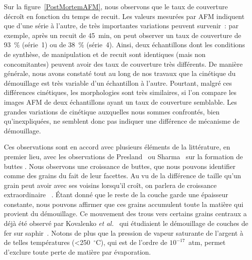 Sur la figure~\ref{PostMortemAFM}, nous observons que le taux de couverture décroît en fonction du temps de recuit. Les valeurs mesurées par AFM indiquent que d'une série à l'autre, de très importantes variations peuvent survenir~: par exemple, après un recuit de 45~min, on peut observer un taux de couverture de 93~\% (série~1) ou de 38~\% (série~4). Ainsi, deux échantillons dont les conditions de synthèse, de manipulation et de recuit sont identiques (mais non concomitantes) peuvent avoir des taux de couverture très différents. De manière générale, nous avons constaté tout au long de nos travaux que la cinétique du démouillage est très variable d'un échantillon à l'autre. Pourtant, malgré ces différences cinétiques, les morphologies sont très similaires, si l'on compare les images AFM de deux échantillons ayant un taux de couverture semblable. Les grandes variations de cinétique auxquelles nous sommes confrontés, bien qu'inexpliquées, ne semblent donc pas indiquer une différence de mécanisme de démouillage.\par


Ces observations sont en accord avec plusieurs éléments de la littérature, en premier lieu, avec les observations de Presland~\cite{presland1972hillock} ou Sharma~\cite{sharma1980agglomeration, sharma1980hillock, sharma1986hillock} sur la formation de \og buttes \fg{}. Nous observons une croissance de buttes, que nous pouvons identifier comme des grains du fait de leur facettes. Au vu de la différence de taille qu'un grain peut avoir avec ses voisins lorsqu'il croît, on parlera de \og croissance extraordinaire \fg{}~\cite{thompson1990grain}. Étant donné que le reste de la couche garde une épaisseur constante, nous pouvons affirmer que ces grains accumulent toute la matière qui provient du démouillage. Ce mouvement des trous vers certains grains centraux a déjà été observé par Kovalenko \textit{et al.}~\cite{kovalenko2013solid} qui étudiaient le démouillage de couches de fer sur saphir~\cite{kovalenko2013solid}. Notons de plus que la pression de vapeur saturante de l'argent à de telles températures (<250~$^\circ$C), qui est de l'ordre de $10^{-17}$~atm, permet d'exclure toute perte de matière par évaporation.\par

